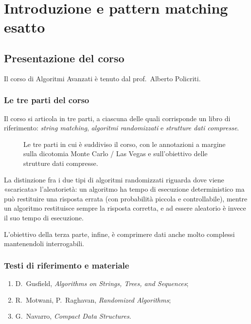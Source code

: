 \chapter{Introduzione e pattern matching esatto}
\label{cap:introduzione}

\section{Presentazione del corso}
\label{sec:presentazione}

Il corso di Algoritmi Avanzati è tenuto dal prof.\ Alberto Policriti.

\subsection{Le tre parti del corso}

Il corso si articola in tre parti, a ciascuna delle quali corrisponde un libro di
riferimento: \emph{string matching}, \emph{algoritmi randomizzati} e
\emph{strutture dati compresse}.

\begin{figure}[H]
  \centering
  
  \caption{Le tre parti in cui è suddiviso il corso, con le annotazioni a margine
  sulla dicotomia Monte Carlo / Las Vegas e sull'obiettivo delle strutture dati compresse.}
  \label{fig:corso-tre-parti}
\end{figure}

\begin{osservazione}
La distinzione fra i due tipi di algoritmi randomizzati riguarda dove viene «scaricata»
l'aleatorietà: un algoritmo \MonteCarlo ha tempo di esecuzione deterministico ma può
restituire una risposta errata (con probabilità piccola e controllabile), mentre un
algoritmo \LasVegas restituisce sempre la risposta corretta, e ad essere aleatorio è
invece il suo tempo di esecuzione.
\end{osservazione}

L'obiettivo della terza parte, infine, è comprimere dati anche molto complessi
mantenendoli interrogabili.

\subsection{Testi di riferimento e materiale}

\begin{enumerate}
  \item D.~Gusfield, \emph{Algorithms on Strings, Trees, and Sequences};
  \item R.~Motwani, P.~Raghavan, \emph{Randomized Algorithms};
  \item G.~Navarro, \emph{Compact Data Structures}.
\end{enumerate}

